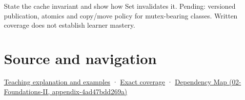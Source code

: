 State the cache invariant and show how Set invalidates it. Pending: versioned publication, atomics and copy/move policy for mutex-bearing classes. Written coverage does not establish learner mastery.

\section{Source and navigation}\label{appendix-f5593256bcaf-source-and-navigation}

\href{Continuous\%20Notes/Computing\%20Foundations\%20-\%20From\%20Bits\%20to\%20C++\%20and\%20Systems\%20APIs\#A\%20cache\%20may\%20change\%20bits\%20without\%20changing\%20meaning}{Teaching explanation and examples} · \hyperref[appendix-fd090d982a15-m008---parts-113-126]{Exact coverage} · \href{../02-Foundations-II/main.pdf\#nameddest=appendix-4ad47bdd269a}{Dependency Map (02-Foundations-II, appendix-4ad47bdd269a)}
